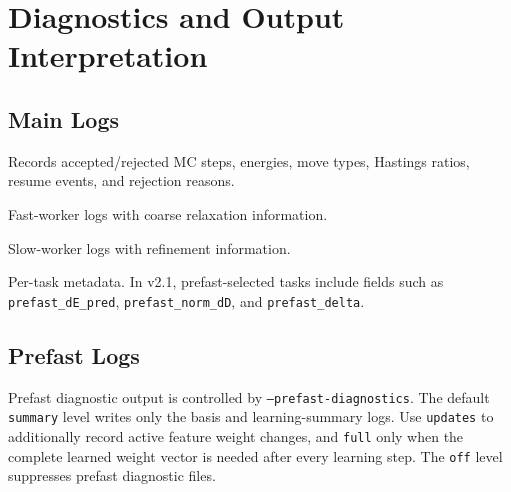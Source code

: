 \documentclass[11pt]{article}
\begin{document}
\section{Diagnostics and Output Interpretation}

\subsection{Main Logs}

\begin{description}[leftmargin=3cm,style=nextline]
\item[\texttt{mc.log}]
Records accepted/rejected MC steps, energies, move types, Hastings ratios, resume events, and rejection reasons.

\item[\texttt{fast\_*.log}]
Fast-worker logs with coarse relaxation information.

\item[\texttt{slow\_*.log}]
Slow-worker logs with refinement information.

\item[\texttt{meta.json}]
Per-task metadata. In v2.1, prefast-selected tasks include fields such as \texttt{prefast\_dE\_pred}, \texttt{prefast\_norm\_dD}, and \texttt{prefast\_delta}.
\end{description}

\subsection{Prefast Logs}

Prefast diagnostic output is controlled by \texttt{--prefast-diagnostics}.
The default \texttt{summary} level writes only the basis and learning-summary logs.
Use \texttt{updates} to additionally record active feature weight changes, and \texttt{full} only when the complete learned weight vector is needed after every learning step.
The \texttt{off} level suppresses prefast diagnostic files.
\end{document}
